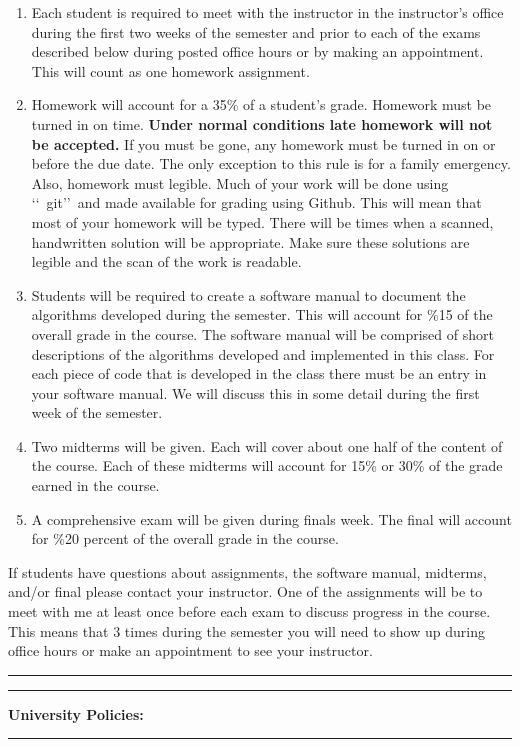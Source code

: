 \documentclass[10pt,fleqn]{article}
\begin{document}
\begin{enumerate}
\item Each student is required to meet with the instructor in the instructor's
      office during the first two weeks of the semester and prior to each of the
      exams described below during posted office hours or by making an
      appointment. This will count as one homework assignment.
\item Homework will account for a 35\% of a student's grade. Homework must be
      turned in on time. {\bf Under normal conditions late homework will not be
      accepted.} If you must be gone, any homework must be turned in on or
      before the due date. The only exception to this rule is for a family
      emergency. Also, homework must legible. Much of your work will be done
      using \lq\lq\ git\rq\rq\ and made available for grading using Github. This
      will mean that most of your homework will be typed. There will be times
      when a scanned, handwritten solution will be appropriate. Make sure these
      solutions are legible and the scan of the work is readable.
\item Students will be required to create a software manual to document the
      algorithms developed during the semester. This will account for \%15 of
      the overall grade in the course. The software manual will be comprised of
      short descriptions of the algorithms developed and implemented in this
      class. For each piece of code that is developed in the class there must be
      an entry in your software manual. We will discuss this in some detail
      during the first week of the semester.
\item Two midterms will be given. Each will cover about one half of the content
      of the course. Each of these midterms will account for 15\% or 30\% of the
      grade earned in the course.
\item A comprehensive exam will be given during finals week. The final will
      account for \%20 percent of the overall grade in the course.
\end{enumerate}
If students have questions about assignments, the software manual, midterms, 
and/or final please contact your instructor. One of the assignments will be to
meet with me at least once before each exam to discuss progress in the course.
This means that 3 times during the semester you will need to show up during
office hours or make an appointment to see your instructor.
\vskip0.1in\hrule\vskip0.1in
\newpage
\vskip0.1in\hrule\vskip0.1in
\noindent
{\bf University Policies:}
\vskip0.1in\hrule\vskip0.1in
\end{document}
